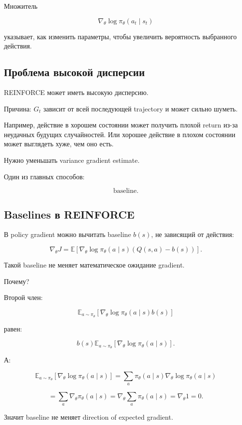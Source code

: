 \documentclass[a4paper,12pt]{article}
\begin{document}
Множитель

\[
\nabla_\theta \log \pi_\theta(a_t\mid s_t)
\]

указывает, как изменить параметры, чтобы увеличить вероятность выбранного действия.

\subsection{Проблема высокой дисперсии}

REINFORCE может иметь высокую дисперсию.

Причина: \(G_t\) зависит от всей последующей trajectory и может сильно шуметь.

Например, действие в хорошем состоянии может получить плохой return из-за неудачных будущих случайностей. Или хорошее действие в плохом состоянии может выглядеть хуже, чем оно есть.

Нужно уменьшать variance gradient estimate.

Один из главных способов:

\[
\text{baseline}.
\]

\subsection{Baselines в REINFORCE}

В policy gradient можно вычитать baseline \(b(s)\), не зависящий от действия:

\[
\nabla_\theta J
=
\mathbb{E}
[
\nabla_\theta
\log \pi_\theta(a\mid s)
(Q(s,a)-b(s))
].
\]

Такой baseline не меняет математическое ожидание gradient.

Почему?

Второй член:

\[
\mathbb{E}_{a\sim\pi_\theta}
[
\nabla_\theta
\log \pi_\theta(a\mid s)b(s)
]
\]

равен:

\[
b(s)
\mathbb{E}_{a\sim\pi_\theta}
[
\nabla_\theta
\log \pi_\theta(a\mid s)
].
\]

А:

\[
\mathbb{E}_{a\sim\pi_\theta}
[
\nabla_\theta
\log \pi_\theta(a\mid s)
]
=
\sum_a
\pi_\theta(a\mid s)
\nabla_\theta
\log \pi_\theta(a\mid s)
\]

\[
=
\sum_a
\nabla_\theta
\pi_\theta(a\mid s)
=
\nabla_\theta
\sum_a
\pi_\theta(a\mid s)
=
\nabla_\theta 1
=
0.
\]

Значит baseline не меняет direction of expected gradient.
\end{document}
